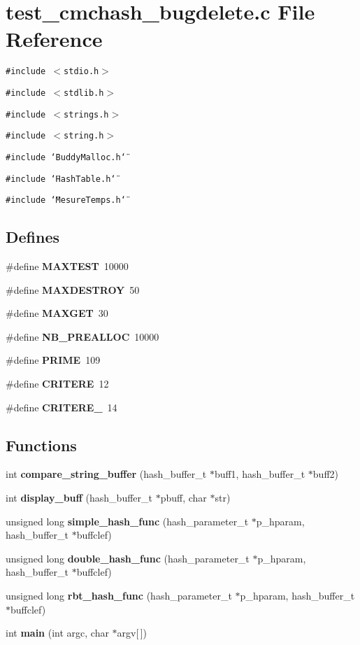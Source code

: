 \section{test\_\-cmchash\_\-bugdelete.c File Reference}
\label{test__cmchash__bugdelete_8c}
{\tt \#include $<$stdio.h$>$}\par
{\tt \#include $<$stdlib.h$>$}\par
{\tt \#include $<$strings.h$>$}\par
{\tt \#include $<$string.h$>$}\par
{\tt \#include \char`\"{}Buddy\-Malloc.h\char`\"{}}\par
{\tt \#include \char`\"{}Hash\-Table.h\char`\"{}}\par
{\tt \#include \char`\"{}Mesure\-Temps.h\char`\"{}}\par
\subsection*{Defines}
\begin{CompactItemize}
\item 
\#define {\bf MAXTEST}\ 10000
\item 
\#define {\bf MAXDESTROY}\ 50
\item 
\#define {\bf MAXGET}\ 30
\item 
\#define {\bf NB\_\-PREALLOC}\ 10000
\item 
\#define {\bf PRIME}\ 109
\item 
\#define {\bf CRITERE}\ 12
\item 
\#define {\bf CRITERE\_}\ 14
\end{CompactItemize}
\subsection*{Functions}
\begin{CompactItemize}
\item 
int {\bf compare\_\-string\_\-buffer} (hash\_\-buffer\_\-t $\ast$buff1, hash\_\-buffer\_\-t $\ast$buff2)
\item 
int {\bf display\_\-buff} (hash\_\-buffer\_\-t $\ast$pbuff, char $\ast$str)
\item 
unsigned long {\bf simple\_\-hash\_\-func} (hash\_\-parameter\_\-t $\ast$p\_\-hparam, hash\_\-buffer\_\-t $\ast$buffclef)
\item 
unsigned long {\bf double\_\-hash\_\-func} (hash\_\-parameter\_\-t $\ast$p\_\-hparam, hash\_\-buffer\_\-t $\ast$buffclef)
\item 
unsigned long {\bf rbt\_\-hash\_\-func} (hash\_\-parameter\_\-t $\ast$p\_\-hparam, hash\_\-buffer\_\-t $\ast$buffclef)
\item 
int {\bf main} (int argc, char $\ast$argv[$\,$])
\end{CompactItemize}

